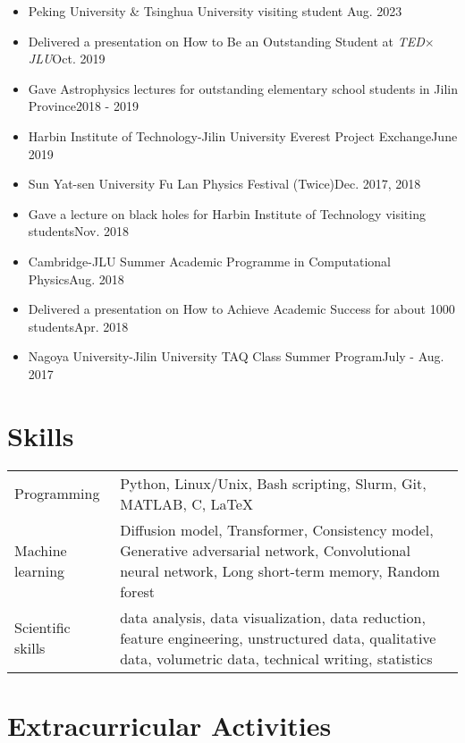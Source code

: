 \documentclass[a4paper,12pt]{article}
\begin{document}
\begin{itemize}[leftmargin=0cm]
\setlength{\itemsep}{-5pt}
\item[] Peking University \& Tsinghua University visiting student \hfill Aug. 2023  
\item[] Delivered a presentation on How to Be an Outstanding Student at {\textit{TED$\times$JLU}}\hfill Oct. 2019
\item[] Gave Astrophysics lectures for outstanding elementary school students in Jilin Province\hfill 2018 - 2019
\item[] Harbin Institute of Technology-Jilin University Everest Project Exchange\hfill June 2019
\item[] Sun Yat-sen University Fu Lan Physics Festival (Twice)\hfill Dec. 2017, 2018
\item[] Gave a lecture on black holes for Harbin Institute of Technology visiting students\hfill Nov. 2018
\item[] Cambridge-JLU Summer Academic Programme in Computational Physics\hfill Aug. 2018
\item[] Delivered a presentation on How to Achieve Academic Success for about {1000} students\hfill Apr. 2018
\item[] Nagoya University-Jilin University TAQ Class Summer Program\hfill July - Aug. 2017
\end{itemize}
\section{Skills}
\begin{tabularx}{\linewidth}{@{}l X@{}}
Programming &  \normalsize{Python, Linux/Unix, Bash scripting, Slurm, Git, MATLAB, C, \LaTeX}\\
Machine learning &  \normalsize{Diffusion model, Transformer, Consistency model, Generative adversarial network, Convolutional neural network, Long short-term memory, Random forest}\\
Scientific skills & \normalsize{data analysis, data visualization, data reduction, feature engineering, unstructured data, qualitative data, volumetric data, technical writing, statistics}\\  
\end{tabularx}


\section{Extracurricular Activities}
\end{document}
